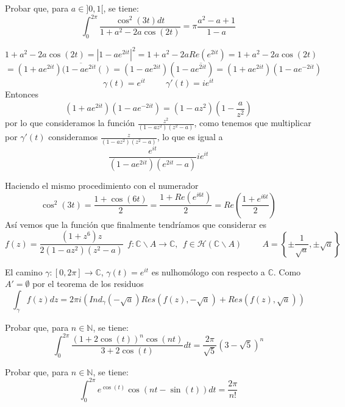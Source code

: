 \begin{ejer}
	Probar que, para $a\in]0,1[$, se tiene:
	$$ \int_0^{2\pi} \frac{\cos^2(3t)dt}{1+a^2-2a\cos(2t)} = \pi\frac{a^2-a+1}{1-a} $$
\end{ejer}

\begin{sol}

$$1+a^2-2a\cos(2 t) = |1-ae^{2it}|^2 = 1+a^2-2aRe(e^{2it}) =  1+a^2-2a\cos(2t)$$
$$ = (1+ae^{2it})(\overline{1-ae^{2it}}()
= (1-ae^{2it})(1-a\overline{e^{2it}}) = (1+ae^{2it})(1-ae^{-2it})$$
$$\gamma(t) = e^{it} \hspace{1cm} \gamma'(t) = ie^{it}$$
Entonces
$$(1+ae^{2it})(1-ae^{-2it}) = (1-az^2)(1-\frac{a}{z^2})$$
por lo que consideramos la función $\frac{z^2}{(1-az^2)(z^2-a)}$, 
como tenemos que multiplicar por $\gamma'(t)$ consideramos $\frac{z}{(1-az^2)(z^2-a)}$, lo que es igual a
$$\frac{e^{it}}{(1-ae^{2it})(e^{2it}-a)} ie^{it}$$

Haciendo el mismo procedimiento con el numerador
$$\cos^2(3t) = \frac{1+\cos(6t)}{2} = \frac{1+Re(e^{i6t})}{2} = Re(\frac{1+e^{i6t}}{2})$$
Así vemos que la función que finalmente tendríamos que considerar es
$$f(z) = \frac{(1+z^6)z}{2(1-az^2)(z^2-a)} \ \ f:\mathbb{C}\backslash A \rightarrow \mathbb{C}, \ \ f\in\mathcal{H}(\mathbb{C}\backslash A) \hspace{1cm} A = \left\{ \pm\frac{1}{\sqrt{a}}, \pm\sqrt{a} \right\}$$

El camino $\gamma:[0,2\pi] \rightarrow \mathbb{C}$, $\gamma(t) = e^{it}$ es nulhomólogo con respecto a $\mathbb{C}$.
Como $A' = \emptyset$ por el teorema de los residuos
$$\int_{\gamma} f(z)dz = 2\pi i \left( Ind_{\gamma}(-\sqrt{a})Res(f(z),-\sqrt{a}) + Res(f(z), \sqrt{a}) \right)$$
\end{sol}

\begin{ejer}
	Probar que, para $n\in\mathbb{N}$, se tiene:
	$$ \int_0^{2\pi} \frac{(1+2\cos(t))^n \cos(nt)}{3+2\cos(t)} dt = \frac{2\pi}{\sqrt{5}} (3-\sqrt{5})^n $$
\end{ejer}


\begin{ejer}
	Probar que, para $n\in\mathbb{N}$, se tiene:
	$$ \int_{0}^{2\pi} e^{\cos(t)} \cos(nt-\sin(t))dt = \frac{2\pi}{n!} $$
\end{ejer}


